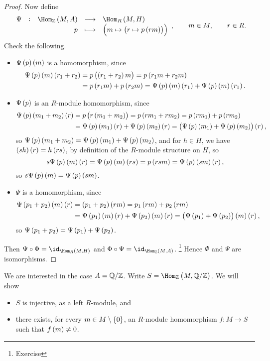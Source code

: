 \begin{proof}
Now define
$$ \function[\Psi]{\Hom_\ZZ\br{M, A}}{\Hom_R\br{M, H}}{p}{\br{m \mapsto \br{r \mapsto p\br{rm}}}}, \qquad m \in M, \qquad r \in R. $$
Check the following.
\begin{itemize}
\item $ \Psi\br{p}\br{m} $ is a homomorphism, since
\begin{align*}
\Psi\br{p}\br{m}\br{r_1 + r_2}
& = p\br{\br{r_1 + r_2}m}
= p\br{r_1m + r_2m} \\
& = p\br{r_1m} + p\br{r_2m}
= \Psi\br{p}\br{m}\br{r_1} + \Psi\br{p}\br{m}\br{r_1}.
\end{align*}
\item $ \Psi\br{p} $ is an $ R $-module homomorphism, since
\begin{align*}
\Psi\br{p}\br{m_1 + m_2}\br{r}
& = p\br{r\br{m_1 + m_2}}
= p\br{rm_1 + rm_2}
= p\br{rm_1} + p\br{rm_2} \\
& = \Psi\br{p}\br{m_1}\br{r} + \Psi\br{p}\br{m_2}\br{r}
= \br{\Psi\br{p}\br{m_1} + \Psi\br{p}\br{m_2}}\br{r},
\end{align*}
so $ \Psi\br{p}\br{m_1 + m_2} = \Psi\br{p}\br{m_1} + \Psi\br{p}\br{m_2} $, and for $ h \in H $, we have $ \br{sh}\br{r} = h\br{rs} $, by definition of the $ R $-module structure on $ H $, so
$$ s\Psi\br{p}\br{m}\br{r} = \Psi\br{p}\br{m}\br{rs} = p\br{rsm} = \Psi\br{p}\br{sm}\br{r}, $$
so $ s\Psi\br{p}\br{m} = \Psi\br{p}\br{sm} $.
\item $ \Psi $ is a homomorphism, since
\begin{align*}
\Psi\br{p_1 + p_2}\br{m}\br{r}
& = \br{p_1 + p_2}\br{rm}
= p_1\br{rm} + p_2\br{rm} \\
& = \Psi\br{p_1}\br{m}\br{r} + \Psi\br{p_2}\br{m}\br{r}
= \br{\Psi\br{p_1} + \Psi\br{p_2}}\br{m}\br{r},
\end{align*}
so $ \Psi\br{p_1 + p_2} = \Psi\br{p_1} + \Psi\br{p_2} $.
\end{itemize}
Then $ \Psi \circ \Phi = \id_{\Hom_R\br{M, H}} $ and $ \Phi \circ \Psi = \id_{\Hom_\ZZ\br{M, A}} $. \footnote{Exercise} Hence $ \Phi $ and $ \Psi $ are isomorphisms.
\end{proof}

We are interested in the case $ A = \mathbb{Q} / \mathbb{Z} $. Write $ S = \Hom_\ZZ\br{M, \QQ / \ZZ} $. We will show
\begin{itemize}
\item $ S $ is injective, as a left $ R $-module, and
\item there exists, for every $ m \in M \setminus \cbr{0} $, an $ R $-module homomorphism $ f : M \to S $ such that $ f\br{m} \ne 0 $.
\end{itemize}

